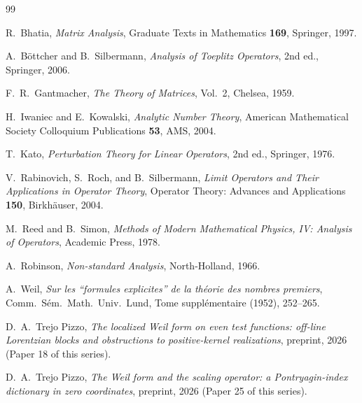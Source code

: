 \documentclass[11pt,reqno]{amsart}
\theoremstyle{definition}
\begin{document}
\begin{thebibliography}{99}

R.~Bhatia,
\emph{Matrix Analysis},
Graduate Texts in Mathematics \textbf{169}, Springer, 1997.

A.~B\"ottcher and B.~Silbermann,
\emph{Analysis of Toeplitz Operators},
2nd ed., Springer, 2006.

F.~R.~Gantmacher,
\emph{The Theory of Matrices}, Vol.~2,
Chelsea, 1959.

H.~Iwaniec and E.~Kowalski,
\emph{Analytic Number Theory},
American Mathematical Society Colloquium Publications \textbf{53}, AMS, 2004.

T.~Kato,
\emph{Perturbation Theory for Linear Operators},
2nd ed., Springer, 1976.

V.~Rabinovich, S.~Roch, and B.~Silbermann,
\emph{Limit Operators and Their Applications in Operator Theory},
Operator Theory: Advances and Applications \textbf{150}, Birkh\"auser, 2004.

M.~Reed and B.~Simon,
\emph{Methods of Modern Mathematical Physics, IV: Analysis of Operators},
Academic Press, 1978.

A.~Robinson,
\emph{Non-standard Analysis},
North-Holland, 1966.

A.~Weil,
\emph{Sur les ``formules explicites'' de la th\'eorie des nombres premiers},
Comm.\ S\'em.\ Math.\ Univ.\ Lund, Tome suppl\'ementaire (1952), 252--265.

 D.~A.~Trejo Pizzo, \emph{The localized Weil form on even test functions: off-line Lorentzian blocks and obstructions to positive-kernel realizations}, preprint, 2026 (Paper 18 of this series).

 D.~A.~Trejo Pizzo, \emph{The Weil form and the scaling operator: a Pontryagin-index dictionary in zero coordinates}, preprint, 2026 (Paper 25 of this series).

\end{thebibliography}
\end{document}

